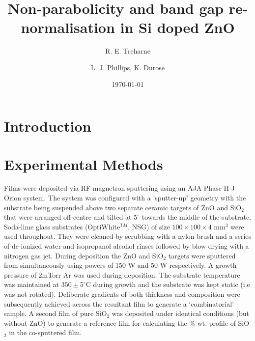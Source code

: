 \documentclass[aps,prl,preprint,showpacs,showkeys,linenumbers]{revtex4-1}
\begin{document}
\title{Non-parabolicity and band gap re-normalisation in Si doped ZnO}
\author{R. E. Treharne}
\author{L. J. Phillips, K. Durose}
\date{\today}
\begin{abstract}
\end{abstract}
\maketitle

\section{Introduction}



\section{Experimental Methods}

Films were deposited via RF magnetron sputtering using an AJA Phase II-J Orion system. The system was configured with a 'sputter-up' geometry with the substrate being suspended above two separate ceramic targets of ZnO and SiO$_2$ that were arranged off-centre and tilted at $5^{\circ}$ towards the middle of the substrate.  Soda-lime glass substrates (OptiWhite$^{TM}$, NSG) of size $100\times100\times4$ mm$^{3}$ were used throughout. They were cleaned by scrubbing with a nylon brush and a series of de-ionized water and isopropanol alcohol rinses followed by blow drying with a nitrogen gas jet. During deposition the ZnO and SiO$_2$ targets were sputtered from simultaneously using powers of $150$ W and $50$ W respectively. A growth pressure of 2mTorr Ar was used during deposition. The substrate temperature was maintained at $350\pm5^{\circ}$C during growth and the substrate was kept static (i.e was not rotated). Deliberate gradients of both thickness and composition were subsequently achieved across the resultant film to generate a `combinatorial' sample. A second film of pure SiO$_{2}$ was deposited under identical conditions (but without ZnO) to generate a reference film for calculating the \% wt. profile of SiO$_{2}$ in the co-sputtered film.
\end{document}

